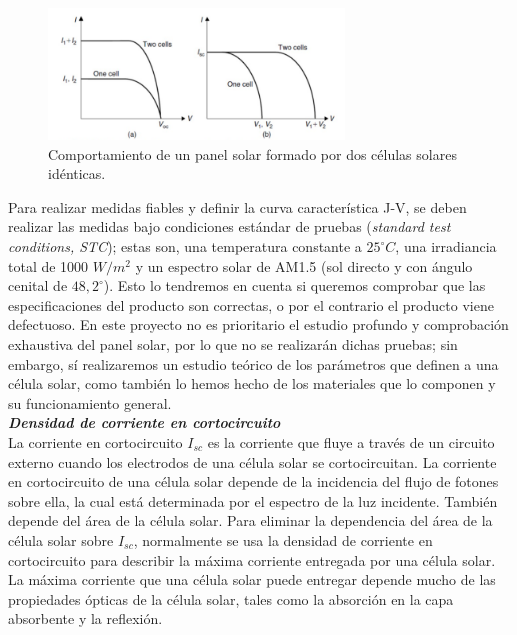 \documentclass[12pt]{article}
\begin{document}
	\begin{figure}[h]
		\begin{center}
			\includegraphics[width=0.7\textwidth]{img/effectTwoIdenticalCells.png}
			\caption{Comportamiento de un panel solar formado por dos células solares idénticas.}
			\label{fig: solar panel of identical solar cells}
		\end{center}
	\end{figure}
	

	\noindent Para realizar medidas fiables y definir la curva característica J-V, se deben realizar las medidas bajo condiciones estándar de pruebas (\textit{standard test conditions, STC}); estas son, una temperatura constante a $25^{\circ}C$, una irradiancia total de 1000 $W/ m^2$ y un espectro solar de AM1.5 (sol directo y con ángulo cenital de $48,2 ^{\circ}$). Esto lo tendremos en cuenta si queremos comprobar que las especificaciones del producto son correctas, o por el contrario el producto viene defectuoso. En este proyecto no es prioritario el estudio profundo y comprobación exhaustiva del panel solar, por lo que no se realizarán dichas pruebas; sin embargo, sí realizaremos un estudio teórico de los parámetros que definen a una célula solar, como también lo hemos hecho de los materiales que lo componen y su funcionamiento general.\\
	
	
	\noindent \textit{\textbf{Densidad de corriente en cortocircuito}} \\
	
	\noindent La corriente en cortocircuito $I_{sc}$ es la corriente que fluye a través de un circuito externo cuando los electrodos de una célula solar se cortocircuitan. La corriente en cortocircuito de una célula solar depende de la incidencia del flujo de fotones sobre ella, la cual está determinada por el espectro de la luz incidente. También depende del área de la célula solar. Para eliminar la dependencia del área de la célula solar sobre $I_{sc}$, normalmente se usa la densidad de corriente en cortocircuito para describir la máxima corriente entregada por una célula solar. La máxima corriente que una célula solar puede entregar depende mucho de las propiedades ópticas de la célula solar, tales como la absorción en la capa absorbente y la reflexión. \\
	
\end{document}
